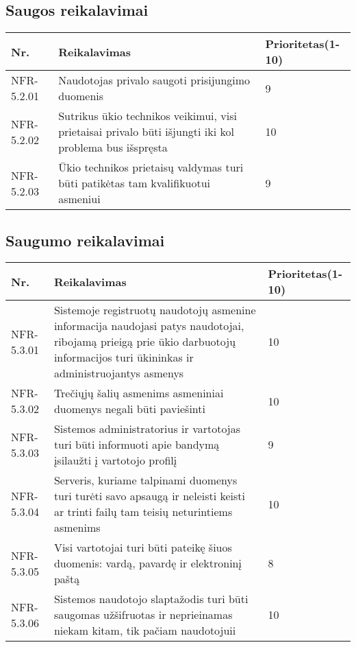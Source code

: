 \documentclass[oneside]{VUMIFPSkursinis}
\begin{document}
\subsection{Saugos reikalavimai}
\begin{table}[htbp]
	\begin{tabularx}{1\textwidth}{ |P{2.5cm}|X|P{3cm }| }  \hline
		Nr. & Reikalavimas & Prioritetas(1-10) \\ \hline
		NFR-5.2.01 & Naudotojas privalo saugoti prisijungimo duomenis & 9 \\ \hline
		NFR-5.2.02 & Sutrikus ūkio technikos veikimui, visi prietaisai privalo būti išjungti iki kol problema bus išspręsta & 10 \\ \hline
		NFR-5.2.03 & Ūkio technikos prietaisų valdymas turi būti patikėtas tam kvalifikuotui asmeniui & 9 \\ \hline
	\end{tabularx}
\end{table}
\subsection{Saugumo reikalavimai}
\begin{table}[htbp]
	\begin{tabularx}{1\textwidth}{ |P{2.5cm}|X|P{3cm }| }  \hline
		Nr. & Reikalavimas & Prioritetas(1-10) \\ \hline
		NFR-5.3.01 & Sistemoje registruotų naudotojų asmenine informacija naudojasi patys naudotojai, ribojamą prieigą prie ūkio darbuotojų informacijos turi ūkininkas ir administruojantys asmenys & 10 \\ \hline
		NFR-5.3.02 & Trečiųjų šalių asmenims asmeniniai duomenys negali būti paviešinti & 10 \\ \hline
		NFR-5.3.03 & Sistemos administratorius ir vartotojas turi būti informuoti apie bandymą įsilaužti į vartotojo profilį & 9 \\ \hline
		NFR-5.3.04 & Serveris, kuriame talpinami duomenys turi turėti savo apsaugą ir neleisti keisti ar trinti failų tam teisių neturintiems asmenims & 10 \\ \hline
		NFR-5.3.05 & Visi vartotojai turi būti pateikę šiuos duomenis: vardą, pavardę ir elektroninį paštą  & 8 \\ \hline
		NFR-5.3.06 & Sistemos naudotojo slaptažodis turi būti saugomas užšifruotas ir neprieinamas niekam kitam, tik pačiam naudotojuii & 10 \\ \hline
	\end{tabularx}
\end{table}
\end{document}
